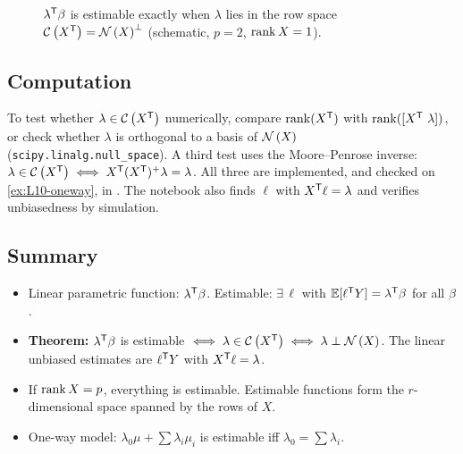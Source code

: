 \begin{figure}[ht]
\centering
{}
\caption{$\lambda^{\mathsf T}\beta$ is estimable exactly when $\lambda$ lies in the row space $\mathcal{C}\left(X^{\mathsf T}\right)=\mathcal{N}\left(X\right)^\perp$ (schematic, $p=2$, $\operatorname{rank} X=1$).}
\label{fig:L10-geom}
\end{figure}

\subsection{Computation}
To test whether $\lambda\in\mathcal{C}\left(X^{\mathsf T}\right)$ numerically, compare $\operatorname{rank}(X^{\mathsf T})$ with $\operatorname{rank}([X^{\mathsf T}\ \lambda])$,
or check whether $\lambda$ is orthogonal to a basis of $\mathcal{N}\left(X\right)$ (\texttt{scipy.linalg.null\_space}).
A third test uses the Moore--Penrose inverse: $\lambda\in\mathcal{C}\left(X^{\mathsf T}\right)\iff X^{\mathsf T}(X^{\mathsf T})^{+}\lambda=\lambda$.
All three are implemented, and checked on \cref{ex:L10-oneway}, in
. The notebook also finds $\ell$ with $X^{\mathsf T}\ell=\lambda$ and
verifies unbiasedness by simulation.

\subsection{Summary}
\begin{itemize}
  \item Linear parametric function: $\lambda^{\mathsf T}\beta$. Estimable: $\exists\,\ell$ with $\mathbb E[\ell^{\mathsf T} Y]=\lambda^{\mathsf T}\beta$ for all $\beta$.
  \item \textbf{Theorem:} $\lambda^{\mathsf T}\beta$ is estimable $\iff\lambda\in\mathcal{C}\left(X^{\mathsf T}\right)\iff\lambda\perp\mathcal{N}\left(X\right)$. The linear unbiased estimates are $\ell^{\mathsf T} Y$ with $X^{\mathsf T}\ell=\lambda$.
  \item If $\operatorname{rank} X=p$, everything is estimable. Estimable functions form the $r$-dimensional space spanned by the rows of $X$.
  \item One-way model: $\lambda_0\mu+\sum\lambda_i\mu_i$ is estimable iff $\lambda_0=\sum\lambda_i$.
\end{itemize}

